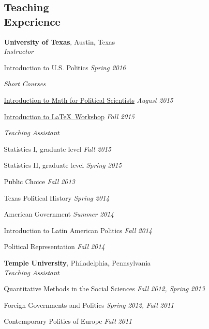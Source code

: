 \documentclass[margin,line]{res}
\newenvironment{list2}{
    \begin{list}{--}{%
        \setlength{\itemsep}{0in}
        \setlength{\parsep}{0in} \setlength{\parskip}{0in}
        \setlength{\topsep}{0in} \setlength{\partopsep}{0in}
        \setlength{\leftmargin}{0.2in}}}{\end{list}}
\begin{document}
\begin{resume}
\section{\sc Teaching \\Experience}
\textbf{University of Texas}, Austin, Texas  \\
\emph{Instructor}
\begin{list2}
\item \href{http://jabranham.com/GOV310L}{Introduction to U.S.
    Politics} \hfill \emph{Spring 2016}
\end{list2}

\emph{Short Courses}
\begin{list2}
\item
  \href{https://github.com/jabranham/math-camp}{Introduction
    to Math for Political Scientists} \hfill \emph{August
    2015}
\item
  \href{https://github.com/jabranham/latex-workshop}{Introduction
    to \LaTeX~Workshop} \hfill \emph{Fall 2015}
\end{list2}

\emph{Teaching Assistant} 
\begin{list2}
\item Statistics I, graduate level \hfill \emph{Fall 2015}
\item Statistics II, graduate level \hfill \emph{Spring 2015}
\item Public Choice \hfill \emph{Fall 2013}
\item Texas Political History \hfill \emph{Spring 2014}
\item American Government \hfill \emph{Summer 2014}
\item Introduction to Latin American Politics \hfill \emph{Fall 2014}
\item Political Representation \hfill \emph{Fall 2014}
\end{list2}

\textbf{Temple University}, Philadelphia, Pennsylvania  \\
\emph{Teaching Assistant}

\begin{list2}
\item Quantitative Methods in the Social Sciences \hfill \emph{Fall 2012, Spring 2013}
\item Foreign Governments and Politics \hfill \emph{Spring 2012, Fall 2011}
\item Contemporary Politics of Europe \hfill \emph{Fall 2011}
\end{list2}


\end{resume}
\end{document}
